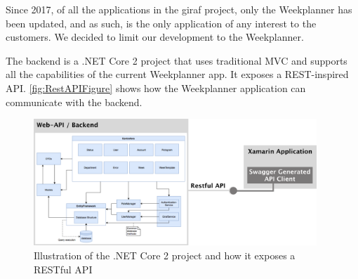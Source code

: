 Since 2017, of all the applications in the \gls{giraf} project, only the Weekplanner has been updated, and as such, is the only application of any interest to the customers. We decided to limit our development to the Weekplanner. 

The backend is a .NET Core 2 project that uses traditional MVC and supports all the capabilities of the current Weekplanner app. It exposes a REST-inspired API. \autoref{fig:RestAPIFigure} shows how the Weekplanner application can communicate with the backend.

\begin{figure}[H]
        \begin{center}
            \includegraphics[width=0.95\textwidth]{figures/RestAPIFigure.pdf}
        \end{center}
        \caption{Illustration of the .NET Core 2 project and how it exposes a RESTful API}
        \label{fig:RestAPIFigure}
\end{figure}

